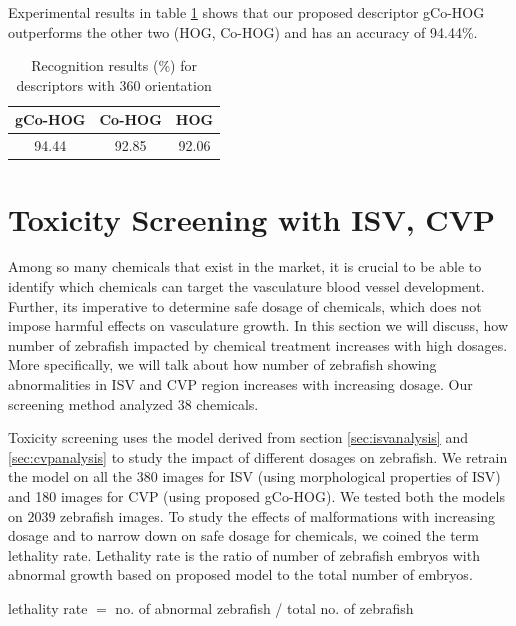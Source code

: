 Experimental results in table \ref{table:acc} shows that our proposed descriptor gCo-HOG outperforms the other two (HOG, Co-HOG) and has an accuracy of 94.44\%.

\begin{table}[h] 
\begin{center}
	\caption{Recognition results (\%) for descriptors with 360 \degree orientation} 
    \begin{tabular}{| c | c | c |}
    \hline
    \textbf{gCo-HOG} & \textbf{Co-HOG}  & \textbf{HOG} \\ \hline \hline
		94.44 & 92.85 & 92.06  \\ \hline
    \end{tabular}
		\label{table:acc} 
\end{center}
\end{table} 


\section{Toxicity Screening with ISV, CVP}

Among so many chemicals that exist in the market, it is crucial to be able to identify which chemicals can target the vasculature blood vessel development. Further, its imperative to determine safe dosage of chemicals, which does not impose harmful effects on vasculature growth. In this section we will discuss, how number of zebrafish impacted by chemical treatment increases with high dosages. More specifically, we will talk about how number of zebrafish showing abnormalities in ISV and CVP region increases with increasing dosage. Our screening method analyzed $38$ chemicals.

Toxicity screening uses the model derived from section \ref{sec:isvanalysis} and \ref{sec:cvpanalysis} to study the impact of different dosages on zebrafish. We retrain the model on all the 380 images for ISV (using morphological properties of ISV) and 180 images for CVP (using proposed gCo-HOG). We tested both the models on $2039$ zebrafish images. To study the effects of malformations with increasing dosage and to narrow down on safe dosage for chemicals, we coined the term lethality rate. Lethality rate is the ratio of number of zebrafish embryos with abnormal growth based on proposed model to the total number of embryos. 

\begin{center}							lethality rate $=$ no. of abnormal zebrafish / total no. of zebrafish  
\end{center} 


